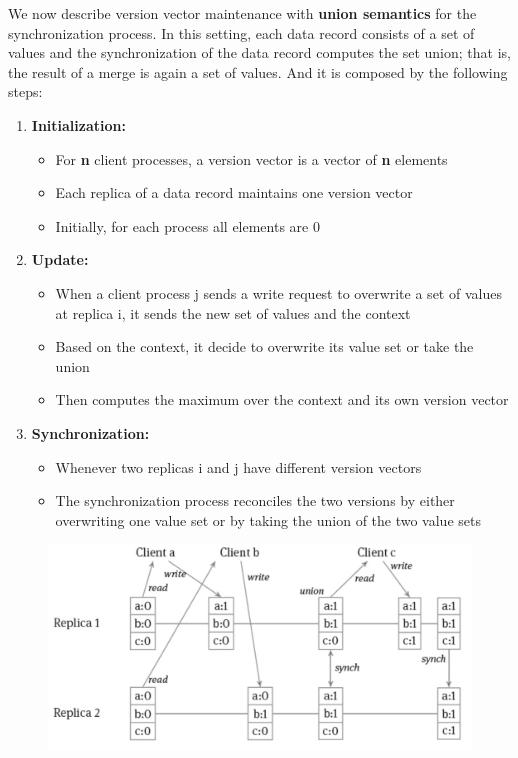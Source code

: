 We now describe version vector maintenance with \textbf{union semantics} for the synchronization process. In this setting, each data record consists of a set of values and the synchronization of the data record computes the set union; that is, the result of a merge is again a set of values. And it is composed by the following steps:
\begin{enumerate}
    \item \textbf{Initialization:}
    \begin{itemize}
        \item For \textbf{n} client processes, a version vector is a vector of \textbf{n} elements
        \item Each replica of a data record maintains one version vector
        \item Initially, for each process all elements are 0
    \end{itemize}
    \item \textbf{Update:}
    \begin{itemize}
        \item When a client process j sends a write request to overwrite a set of values at replica i, it sends the new set of values and the context
        \item Based on the context, it decide to overwrite its value set or take the union
        \item Then computes the maximum over the context and its own version vector
    \end{itemize}
    \item \textbf{Synchronization:}
    \begin{itemize}
        \item Whenever two replicas i and j have different version vectors
        \item The synchronization process reconciles the two versions by either overwriting one value set or by taking the union of the two value sets
    \end{itemize}
\end{enumerate}

\begin{figure}[h!]
\centering
\includegraphics[width=.7\linewidth]{images/AdvancedDataManagment/distribute_concurrency_control/version_vector-union_merge.jpeg}
\end{figure}



